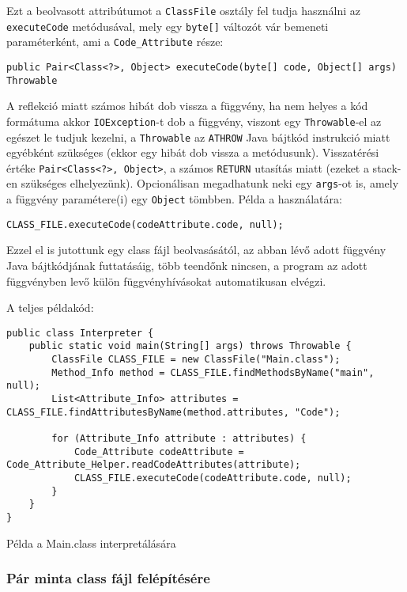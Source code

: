 Ezt a beolvasott attribútumot a \lstinline{ClassFile} osztály fel tudja használni az \lstinline{executeCode} metódusával, mely egy \lstinline{byte[]} változót vár bemeneti paraméterként, ami a \lstinline{Code_Attribute} része:
\begin{verbatim}
public Pair<Class<?>, Object> executeCode(byte[] code, Object[] args) Throwable
\end{verbatim}
A reflekció miatt számos hibát dob vissza a függvény, ha nem helyes a kód formátuma akkor \lstinline{IOException}-t dob a függvény, viszont egy \lstinline{Throwable}-el az egészet le tudjuk kezelni, a \lstinline{Throwable} az \lstinline{ATHROW} Java bájtkód instrukció miatt egyébként szükséges (ekkor egy hibát dob vissza a metódusunk).
Visszatérési értéke \lstinline{Pair<Class<?>, Object>}, a számos \lstinline{RETURN} utasítás miatt (ezeket a stack-en szükséges elhelyezünk).
Opcionálisan megadhatunk neki egy \lstinline{args}-ot is, amely a függvény paramétere(i) egy \lstinline{Object} tömbben.
Példa a használatára:
\begin{verbatim}
CLASS_FILE.executeCode(codeAttribute.code, null);
\end{verbatim}

Ezzel el is jutottunk egy class fájl beolvasásától, az abban lévő adott függvény Java bájtkódjának futtatásáig, több teendőnk nincsen, a program az adott függvényben levő külön függvényhívásokat automatikusan elvégzi.

A teljes példakód:
\begin{listing}[H]
\begin{verbatim}
public class Interpreter {
	public static void main(String[] args) throws Throwable {
		ClassFile CLASS_FILE = new ClassFile("Main.class");
		Method_Info method = CLASS_FILE.findMethodsByName("main", null);
		List<Attribute_Info> attributes = CLASS_FILE.findAttributesByName(method.attributes, "Code");

		for (Attribute_Info attribute : attributes) {
			Code_Attribute codeAttribute = Code_Attribute_Helper.readCodeAttributes(attribute);
			CLASS_FILE.executeCode(codeAttribute.code, null);
		}
	}
}
\end{verbatim}
\caption{Példa a Main.class interpretálására}
\end{listing}

\subsubsection{Pár minta class fájl felépítésére}

